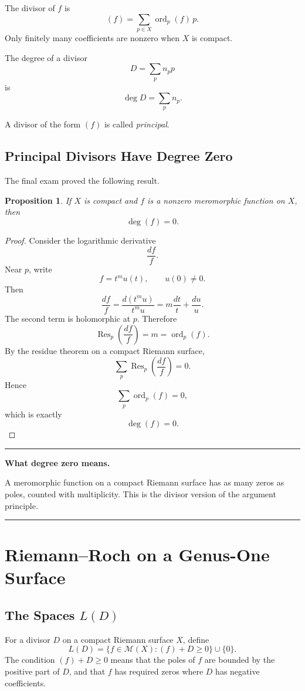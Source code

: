 \documentclass[11pt]{article}
\newcommand{\M}{\mathcal{M}}
\newcommand{\ord}{\operatorname{ord}}
\newcommand{\Res}{\operatorname{Res}}
\newcommand{\degdiv}{\operatorname{deg}}
\newtheorem*{proposition}{Proposition}
\newenvironment{keyidea}[1]{%
  \par\medskip
  \begin{center}
  \begin{minipage}{0.92\textwidth}
  \hrule
  \smallskip
  \textbf{#1.}\quad\ignorespaces
}{%
  \smallskip
  \hrule
  \end{minipage}
  \end{center}
  \medskip
}
\begin{document}
The divisor of \(f\) is
\[
(f)=\sum_{p\in X}\ord_p(f)\,p.
\]
Only finitely many coefficients are nonzero when \(X\) is compact.

The degree of a divisor
\[
D=\sum_p n_p p
\]
is
\[
\degdiv D=\sum_p n_p.
\]

A divisor of the form \((f)\) is called \emph{principal}.

\subsection{Principal Divisors Have Degree Zero}

The final exam proved the following result.

\begin{proposition}
If \(X\) is compact and \(f\) is a nonzero meromorphic function on \(X\), then
\[
\degdiv(f)=0.
\]
\end{proposition}

\begin{proof}
Consider the logarithmic derivative
\[
\frac{df}{f}.
\]
Near \(p\), write
\[
f=t^m u(t),
\qquad u(0)\neq0.
\]
Then
\[
\frac{df}{f}
=
\frac{d(t^m u)}{t^m u}
=
m\frac{dt}{t}+\frac{du}{u}.
\]
The second term is holomorphic at \(p\).  Therefore
\[
\Res_p\left(\frac{df}{f}\right)=m=\ord_p(f).
\]
By the residue theorem on a compact Riemann surface,
\[
\sum_p\Res_p\left(\frac{df}{f}\right)=0.
\]
Hence
\[
\sum_p\ord_p(f)=0,
\]
which is exactly
\[
\degdiv(f)=0.
\]
\end{proof}

\begin{keyidea}{What degree zero means}
A meromorphic function on a compact Riemann surface has as many zeros as
poles, counted with multiplicity.  This is the divisor version of the
argument principle.
\end{keyidea}

\section{Riemann--Roch on a Genus-One Surface}

\subsection{\texorpdfstring{The Spaces \(L(D)\)}{The Spaces L(D)}}

For a divisor \(D\) on a compact Riemann surface \(X\), define
\[
L(D)=
\{f\in\M(X):(f)+D\geq0\}\cup\{0\}.
\]
The condition \((f)+D\geq0\) means that the poles of \(f\) are bounded by
the positive part of \(D\), and that \(f\) has required zeros where \(D\) has
negative coefficients.
\end{document}
